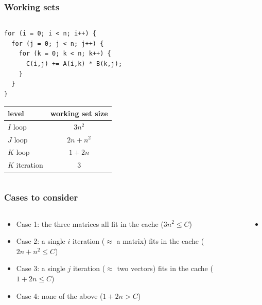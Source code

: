 \documentclass[12pt,dvipdfmx]{beamer}
\newcommand{\ao}[1]{{\color{blue}#1}}
\begin{document}
\begin{frame}[fragile]
\frametitle{Working sets}
\begin{columns}

\begin{column}{0.5\textwidth}
\begin{lstlisting}
for (i = 0; i < n; i++) {
  for (j = 0; j < n; j++) {
    for (k = 0; k < n; k++) {
      C(i,j) += A(i,k) * B(k,j);
    }
  }
}
\end{lstlisting}

\begin{tabular}{|l|c|}\hline
level    & working set size  \\\hline
$I$ loop & $3n^2$            \\  
$J$ loop & $2n + n^2$        \\  
$K$ loop & $1 + 2n$          \\
$K$ iteration & $3$          \\\hline
\end{tabular}
\end{column}

\begin{column}{0.5\textwidth}
\begin{center}
\def\svgwidth{0.9\textwidth}
{\tiny }
\end{center}
\end{column}
\end{columns}
\end{frame}

\begin{frame}[fragile]
\frametitle{Cases to consider}
\begin{columns}
  \begin{column}{0.5\textwidth}
    \begin{itemize}
    \item<2-> Case 1: the three matrices all fit in the cache ($3n^2 \leq C$)
    \item<3-> Case 2: a single $i$ iteration ($\approx$ \ao{a matrix}) fits in the cache
      ($2n+n^2 \leq C$)
    \item<4-> Case 3: a single $j$ iteration ($\approx$ \ao{two vectors}) fits in the cache
      ($1+2n \leq C$)
    \item<5-> Case 4: none of the above ($1+2n > C$)
    \end{itemize}
  \end{column}

  \begin{column}{0.5\textwidth}
    \begin{itemize}
    \item []
    \end{itemize}
  \end{column}
\end{columns}
\end{frame}
\end{document}
